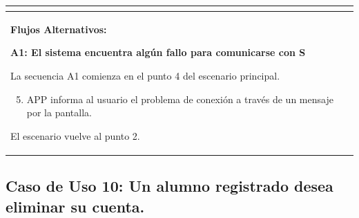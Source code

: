 \begin{longtable}{|l|p{5.5cm}|l|p{2cm}|l|p{1.9cm}|}
{    } \\ \hline

    \multicolumn{6}{|p{15cm}|}{ \textbf{Flujos Alternativos: }
    
    \textbf{A1: El sistema encuentra algún fallo para comunicarse con S}
    
    La secuencia A1 comienza en el punto 4 del escenario principal.
    \begin{enumerate}
        \setcounter{enumi}{4}
        \item APP informa al usuario el problema de conexión a través de un mensaje por la pantalla.
    \end{enumerate}

    El escenario vuelve al punto 2.

    } \\ \hline

\end{longtable}


\subsection{Caso de Uso 10: Un alumno registrado desea eliminar su cuenta.}

